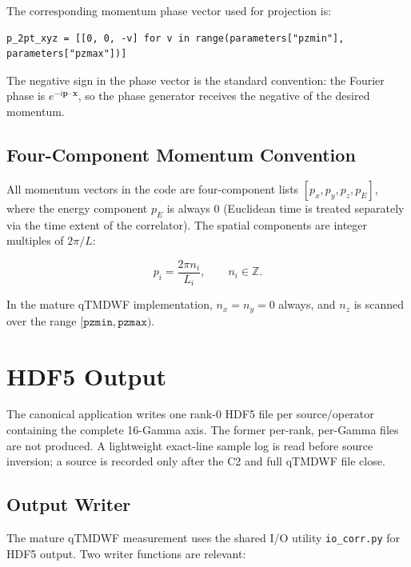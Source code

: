 \documentclass[11pt]{article}
\begin{document}
The corresponding momentum phase vector used for projection is:

\begin{lstlisting}
p_2pt_xyz = [[0, 0, -v] for v in range(parameters["pzmin"], parameters["pzmax"])]
\end{lstlisting}

The negative sign in the phase vector is the standard convention: the Fourier phase is $e^{-i \mathbf{p} \cdot \mathbf{x}}$, so the phase generator receives the negative of the desired momentum.

\subsection{Four-Component Momentum Convention}

All momentum vectors in the code are four-component lists $[p_x, p_y, p_z, p_E]$, where the energy component $p_E$ is always 0 (Euclidean time is treated separately via the time extent of the correlator). The spatial components are integer multiples of $2\pi/L$:

\begin{equation}
    p_i = \frac{2\pi n_i}{L_i}, \qquad n_i \in \mathbb{Z}.
\end{equation}

In the mature qTMDWF implementation, $n_x = n_y = 0$ always, and $n_z$ is scanned over the range $[\texttt{pzmin}, \texttt{pzmax})$.

\section{HDF5 Output}
The canonical application writes one rank-0 HDF5 file per source/operator
containing the complete 16-Gamma axis. The former per-rank, per-Gamma files are
not produced. A lightweight exact-line sample log is read before source
inversion; a source is recorded only after the C2 and full qTMDWF file close.
\label{sec:hdf5}

\subsection{Output Writer}

The mature qTMDWF measurement uses the shared I/O utility \texttt{io\_corr.py} for HDF5 output. Two writer functions are relevant:
\end{document}

